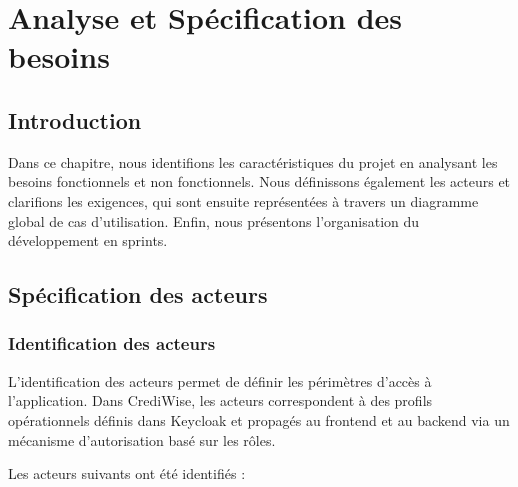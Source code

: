 ﻿\chapter{Analyse et Spécification des besoins}

\section*{Introduction}

Dans ce chapitre, nous identifions les caractéristiques du projet en analysant les besoins
fonctionnels et non fonctionnels. Nous définissons également les acteurs et clarifions les
exigences, qui sont ensuite représentées à travers un diagramme global de cas d'utilisation.
Enfin, nous présentons l'organisation du développement en sprints.

\section{Spécification des acteurs}

\subsection{Identification des acteurs}

L'identification des acteurs permet de définir les périmètres d'accès à l'application.
Dans CrediWise, les acteurs correspondent à des profils opérationnels définis dans Keycloak
et propagés au frontend et au backend via un mécanisme d'autorisation basé sur les rôles.

Les acteurs suivants ont été identifiés :

